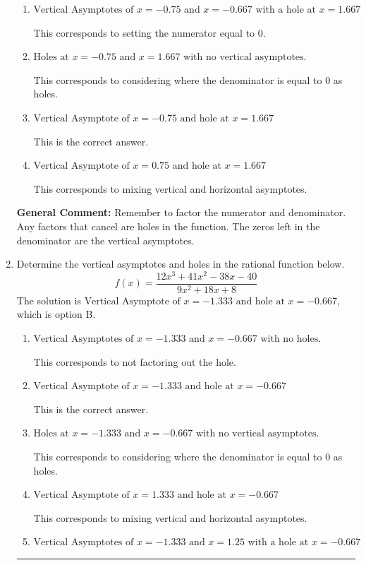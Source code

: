 \documentclass{extbook}[14pt]
\newcommand{\litem}[1]{\item #1

\rule{\textwidth}{0.4pt}}
\begin{document}
\begin{enumerate}
{\begin{enumerate}[label=\Alph*.]
This corresponds to not factoring out the hole.
\item \( \text{Vertical Asymptotes of } x = -0.75 \text{ and } x = -0.667 \text{ with a hole at } x = 1.667 \)

This corresponds to setting the numerator equal to 0.
\item \( \text{Holes at } x = -0.75 \text{ and } x = 1.667 \text{ with no vertical asymptotes.} \)

This corresponds to considering where the denominator is equal to 0 as holes.
\item \( \text{Vertical Asymptote of } x = -0.75 \text{ and hole at } x = 1.667 \)

This is the correct answer.
\item \( \text{Vertical Asymptote of } x = 0.75 \text{ and hole at } x = 1.667 \)

This corresponds to mixing vertical and horizontal asymptotes.
\end{enumerate}

\textbf{General Comment:} Remember to factor the numerator and denominator. Any factors that cancel are holes in the function. The zeros left in the denominator are the vertical asymptotes.
}
\litem{
Determine the vertical asymptotes and holes in the rational function below.
\[ f(x) = \frac{12x^{3} +41 x^{2} -38 x -40}{9x^{2} +18 x + 8} \]The solution is \( \text{Vertical Asymptote of } x = -1.333 \text{ and hole at } x = -0.667 \), which is option B.\begin{enumerate}[label=\Alph*.]
\item \( \text{Vertical Asymptotes of } x = -1.333 \text{ and } x = -0.667 \text{ with no holes.} \)

This corresponds to not factoring out the hole.
\item \( \text{Vertical Asymptote of } x = -1.333 \text{ and hole at } x = -0.667 \)

This is the correct answer.
\item \( \text{Holes at } x = -1.333 \text{ and } x = -0.667 \text{ with no vertical asymptotes.} \)

This corresponds to considering where the denominator is equal to 0 as holes.
\item \( \text{Vertical Asymptote of } x = 1.333 \text{ and hole at } x = -0.667 \)

This corresponds to mixing vertical and horizontal asymptotes.
\item \( \text{Vertical Asymptotes of } x = -1.333 \text{ and } x = 1.25 \text{ with a hole at } x = -0.667 \)


\end{enumerate}}
\end{enumerate}
\end{document}
